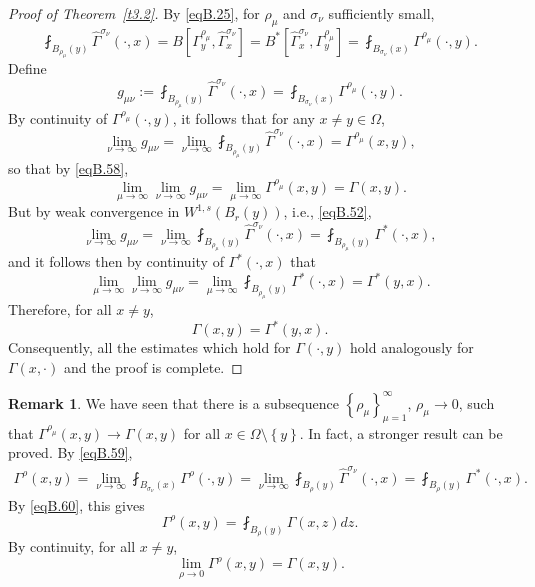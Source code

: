 \documentclass[12pt,reqno]{amsart}
\theoremstyle{plain}
\theoremstyle{definition}
\newtheorem*{rem}{Remark}
\newenvironment{pf}
{\begin{proof}} {\end{proof}}
\newcommand{\Ga}{\Gamma}
\newcommand{\Om}{\Omega}
\newcommand{\si}{\sigma}
\newcommand{\iny}{\infty}
\newcommand{\set}[1]{\left\{#1\right\}}
\newcommand{\brac}[1]{\left[#1\right]}
\newcommand{\pr}[1]{\left( #1 \right) }
\begin{document}
\begin{appendix}
\begin{pf}[Proof of Theorem~\ref{t3.2}]
By \eqref{eqB.25}, for $\rho_\mu$ and $\sigma_\nu$ sufficiently small,
\begin{equation}
 \fint_{B_{\rho_\mu}\pr{y}} \widehat \Ga^{\sigma_\nu} \pr{\cdot, x} 
 = {B}\brac{ \Ga^{\rho_\mu}_y, \widehat \Ga^{\si_\nu}_x}
 = {B}^*\brac{\widehat \Ga^{\si_\nu}_x, \Ga^{\rho_\mu}_y}
 = \fint_{B_{\si_\nu}\pr{x}} \Ga^{\rho_\mu}(\cdot, y).
 \label{eqB.59}
\end{equation}
Define
$$g_{\mu \nu}
:= \fint_{B_{\rho_\mu}\pr{y}} \widehat \Ga^{\si_\nu}\pr{\cdot, x} 
=  \fint_{B_{\si_\nu}\pr{x}} \Ga^{\rho_\mu}\pr{\cdot, y} .$$
By continuity of $\Ga^{\rho_\mu}\pr{\cdot, y}$, it follows that for any $x \ne y \in \Om$,
$$\lim_{\nu \to \iny} g_{\mu \nu}
= \lim_{\nu \to \iny}  \fint_{B_{\rho_\mu}\pr{y}} \widehat \Ga^{\si_\nu}\pr{\cdot, x} 
=  \Ga^{\rho_\mu}\pr{x, y},$$
so that by \eqref{eqB.58},
$$\lim_{\mu \to \iny}\lim_{\nu \to \iny} g_{\mu \nu}
= \lim_{\mu \to \iny} \Ga^{\rho_\mu}\pr{x, y} 
= \Ga\pr{x, y}.$$
But by weak convergence in $W^{1,s}\pr{B_r\pr{y}}$, i.e., \eqref{eqB.52},
$$\lim_{\nu \to \iny} g_{\mu \nu}
= \lim_{\nu \to \iny} \fint_{B_{\rho_\mu}\pr{y}} \widehat \Ga^{\si_{\nu}}\pr{\cdot, x} 
= \fint_{B_{\rho_\mu}\pr{y}} \Ga^* \pr{\cdot, x},$$
and it follows then by continuity of $\Ga^*\pr{\cdot, x}$ that
$$\lim_{\mu \to \iny}\lim_{\nu \to \iny} g_{\mu \nu}
= \lim_{\mu \to \iny} \fint_{B_{\rho_\mu}\pr{y}} \Ga^* \pr{\cdot, x} 
= \Ga^* \pr{y, x}.$$
Therefore, for all ${x \ne y}$,
\begin{equation}
\Ga\pr{x,y} = \Ga^*\pr{y,x}.
\label{eqB.60}
\end{equation}
Consequently, all the estimates which hold for $\Ga\pr{\cdot, y}$ hold analogously for $\Ga\pr{x, \cdot}$ and the proof is complete.
\end{pf}

\begin{rem}
We have seen that there is a subsequence $\set{\rho_{\mu}}_{\mu = 1}^ \iny$, $\rho_\mu \to 0$, such that $\Ga^{\rho_\mu}\pr{x, y} \to \Ga\pr{x, y}$ for all $x\in \Om \setminus \set{y}$. 
In fact, a stronger result can be proved.  
By \eqref{eqB.59},
\begin{align*}
\Ga^{\rho}\pr{x,y}
= \lim_{\nu \to \iny} \fint_{B_{\si_\nu}\pr{x}} \Ga^\rho\pr{\cdot, y} 
= \lim_{\nu \to \iny} \fint_{B_\rho\pr{y}} \widehat \Ga^{\si_{\nu}}\pr{\cdot, x} 
= \fint_{B_\rho\pr{y}} \Ga^{ \, *}\pr{\cdot, x}. %
\end{align*}
By \eqref{eqB.60}, this gives
$$\Ga^{\rho}\pr{x,y}  = \fint_{B_\rho\pr{y}} \Ga\pr{x, z}dz.$$
By continuity, for all $x \ne y$,
\begin{equation*}
\lim_{\rho \to 0} \Ga^\rho\pr{x,y} = \Ga\pr{x,y}.
\end{equation*}
\end{rem}

\end{appendix}
\end{document}
